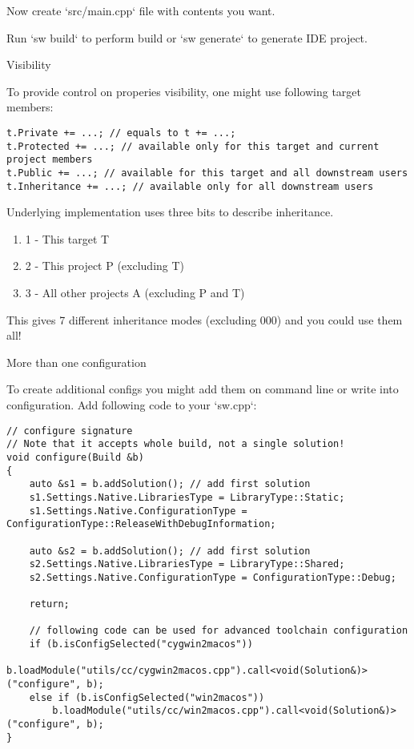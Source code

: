 Now create `src/main.cpp` file with contents you want.

Run `sw build` to perform build or `sw generate` to generate IDE project.



Visibility

To provide control on properies visibility, one might use following target members:

\begin{verbatim}
t.Private += ...; // equals to t += ...;
t.Protected += ...; // available only for this target and current project members
t.Public += ...; // available for this target and all downstream users
t.Inheritance += ...; // available only for all downstream users
\end{verbatim}

Underlying implementation uses three bits to describe inheritance.

\begin{enumerate}
\item 1 - This target T
\item 2 - This project P (excluding T)
\item 3 - All other projects A (excluding P and T)
\end{enumerate}

This gives 7 different inheritance modes (excluding 000) and you could use them all!





More than one configuration

To create additional configs you might add them on command line or write into configuration.
Add following code to your `sw.cpp`:

\begin{verbatim}
// configure signature
// Note that it accepts whole build, not a single solution!
void configure(Build &b)
{
    auto &s1 = b.addSolution(); // add first solution
    s1.Settings.Native.LibrariesType = LibraryType::Static;
    s1.Settings.Native.ConfigurationType = ConfigurationType::ReleaseWithDebugInformation;

    auto &s2 = b.addSolution(); // add first solution
    s2.Settings.Native.LibrariesType = LibraryType::Shared;
    s2.Settings.Native.ConfigurationType = ConfigurationType::Debug;

    return;

    // following code can be used for advanced toolchain configuration
    if (b.isConfigSelected("cygwin2macos"))
        b.loadModule("utils/cc/cygwin2macos.cpp").call<void(Solution&)>("configure", b);
    else if (b.isConfigSelected("win2macos"))
        b.loadModule("utils/cc/win2macos.cpp").call<void(Solution&)>("configure", b);
}
\end{verbatim}


